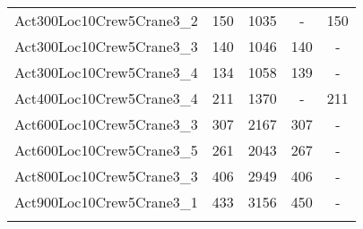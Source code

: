 \begin{center}
\begin{longtable}{ | l | c | c | c | c | }
Act300Loc10Crew5Crane3\_2	&	150	&	1035	&	-	&	150	\\
Act300Loc10Crew5Crane3\_3	&	140	&	1046	&	140	&	-	\\
Act300Loc10Crew5Crane3\_4	&	134	&	1058	&	139	&	-	\\
Act400Loc10Crew5Crane3\_4	&	211	&	1370	&	-	&	211	\\
Act600Loc10Crew5Crane3\_3	&	307	&	2167	&	307	&	-	\\
Act600Loc10Crew5Crane3\_5	&	261	&	2043	&	267	&	-	\\
Act800Loc10Crew5Crane3\_3	&	406	&	2949	&	406	&	-	\\
Act900Loc10Crew5Crane3\_1	&	433	&	3156	&	450	&	-	\\
\hline										
\label{tab:solutionSSTFAARF100s}								
\end{longtable}				
\end{center}							